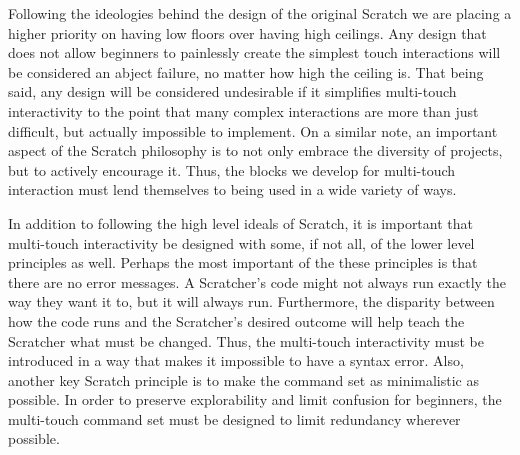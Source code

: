 Following the ideologies behind the design of the original Scratch we are placing a higher priority on having low floors over having high ceilings. Any design that does not allow beginners to painlessly create the simplest touch interactions will be considered an abject failure, no matter how high the ceiling is. That being said, any design will be considered undesirable if it simplifies multi-touch interactivity to the point that many complex interactions are more than just difficult, but actually impossible to implement. On a similar note, an important aspect of the Scratch philosophy is to not only embrace the diversity of projects, but to actively encourage it. Thus, the blocks we develop for multi-touch interaction must lend themselves to being used in a wide variety of ways.

In addition to following the high level ideals of Scratch, it is important that multi-touch interactivity be designed with some, if not all, of the lower level principles as well. Perhaps the most important of the these principles is that there are no error messages. A Scratcher's code might not always run exactly the way they want it to, but it will always run. Furthermore, the disparity between how the code runs and the Scratcher's desired outcome will help teach the Scratcher what must be changed. Thus, the multi-touch interactivity must be introduced in a way that makes it impossible to have a syntax error. Also, another key Scratch principle is to make the command set as minimalistic as possible. In order to preserve explorability and limit confusion for beginners, the multi-touch command set must be designed to limit redundancy wherever possible.


